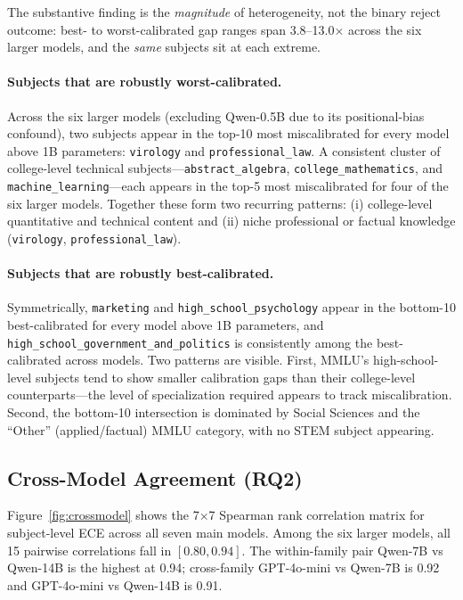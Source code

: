 \documentclass[11pt]{article}
\begin{document}
The substantive finding is the \emph{magnitude} of heterogeneity, not the
binary reject outcome: best- to worst-calibrated gap ranges span
3.8--13.0$\times$ across the six larger models, and the \emph{same} subjects
sit at each extreme.

\paragraph{Subjects that are robustly worst-calibrated.} Across the six larger
models (excluding Qwen-0.5B due to its positional-bias confound), two subjects
appear in the top-10 most miscalibrated for every model above 1B parameters:
\texttt{virology} and \texttt{professional\_law}. A consistent cluster of
college-level technical subjects---\texttt{abstract\_algebra},
\texttt{college\_mathematics}, and \texttt{machine\_learning}---each appears
in the top-5 most miscalibrated for four of the six larger models. Together
these form two recurring patterns: (i) college-level quantitative and technical
content and (ii) niche professional or factual knowledge
(\texttt{virology}, \texttt{professional\_law}).

\paragraph{Subjects that are robustly best-calibrated.} Symmetrically,
\texttt{marketing} and \texttt{high\_school\_psychology} appear in the bottom-10
best-calibrated for every model above 1B parameters, and
\texttt{high\_school\_government\_and\_politics} is consistently among the
best-calibrated across models. Two patterns are visible. First, MMLU's
high-school-level subjects tend to show smaller calibration gaps than
their college-level counterparts---the level of specialization required appears
to track miscalibration. Second, the bottom-10 intersection is dominated by
Social Sciences and the ``Other'' (applied/factual) MMLU category, with no
STEM subject appearing.

\subsection{Cross-Model Agreement (RQ2)}
\label{sec:crossmodel}

Figure~\ref{fig:crossmodel} shows the 7$\times$7 Spearman rank correlation
matrix for subject-level ECE across all seven main models. Among the six larger
models, all 15 pairwise correlations fall in $[0.80, 0.94]$. The within-family
pair Qwen-7B vs Qwen-14B is the highest at 0.94; cross-family GPT-4o-mini vs
Qwen-7B is 0.92 and GPT-4o-mini vs Qwen-14B is 0.91.
\end{document}
